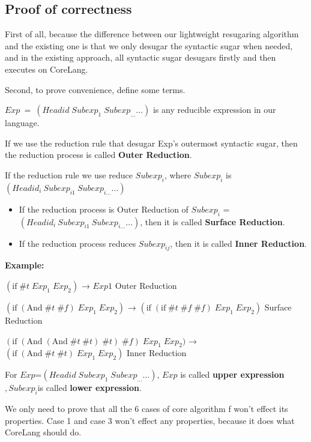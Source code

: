 \subsection{Proof of correctness}

First of all, because the difference between our lightweight resugaring algorithm and the existing one is that we only desugar the syntactic sugar when needed, and in the existing approach, all syntactic sugar desugars firstly and then executes on CoreLang.

Second, to prove convenience, define some terms.

$Exp~=~(Headid\;Subexp_{1}\;Subexp_{\ldots} \ldots)$ is any reducible expression in our language.

If we use the reduction rule that desugar Exp's outermost syntactic sugar, then the reduction process is called {\bfseries Outer Reduction}.

If the reduction rule we use reduce $Subexp_{i}$, where $Subexp_{i}$ is $(Headid_{i}~Subexp_{i1}~Subexp_{i\ldots} \ldots)$
\begin{itemize}
	\item If the reduction process is Outer Reduction of $Subexp_{i}$ = $(Headid_{i}~Subexp_{i1}~Subexp_{i\ldots} \ldots)$, then it is called {\bfseries Surface Reduction}.
	\item If the reduction process reduces $Subexp_{ij}$, then it is called {\bfseries Inner Reduction}.
\end{itemize}

{\bfseries Example:}

$(\mbox{if}\; \#t\; Exp_{1}\; Exp_{2})$ → $Exp1$ \hfill Outer Reduction

$(\mbox{if}\; (\mbox{And}\; \#t\; \#f)\; Exp_{1}\; Exp_{2})$ → $(\mbox{if}\; (\mbox{if}\; \#t\; \#f\; \#f)\; Exp_{1}\; Exp_{2})$ \hfill Surface Reduction

$(\mbox{if}\; (\mbox{And}\; (\mbox{And}\; \#t\; \#t)\; \#t)\; \#f)\; Exp_{1}\; Exp_{2})$ → $(\mbox{if}\; (\mbox{And}\; \#t\; \#t)\; Exp_{1}\; Exp_{2})$ \hfill Inner Reduction

\begin{Def}
For $Exp$=$(Headid\;Subexp_{1}\;Subexp_{\ldots} \ldots)$, $Exp$ is called {\bfseries upper expression}$,Subexp_{i}$is called {\bfseries lower expression}.
\end{Def}

We only need to prove that all the 6 cases of core algorithm f won't effect its properties. Case 1 and case 3 won't effect any properties, because it does what CoreLang should do.

